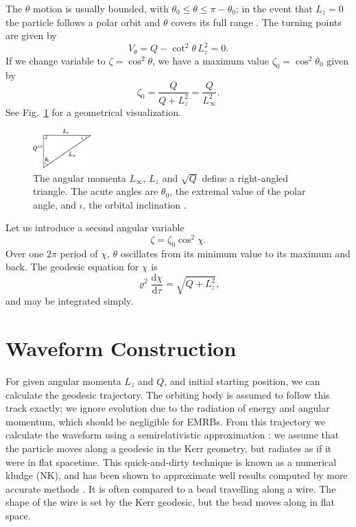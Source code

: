 \documentclass[useAMS,usedcolumn,usegraphicx,usenatbib]{mn2e}
\newcommand{\figref}[1]{Fig.~\ref{fig:#1}}
\newcommand{\dd}{\ensuremath{\mathrm{d}}}
\newcommand{\diff}[2]{\ensuremath{\frac{\dd {#1}}{\dd {#2}}}}
\begin{document}
The $\theta$ motion is usually bounded, with $\theta_0 \leq \theta \leq \pi - \theta_0$; in the event that $L_z = 0$ the particle follows a polar orbit and $\theta$ covers its full range \citep{Wilkins1972}. The turning points are given by
\begin{equation}
V_\theta = Q - \cot^2\theta\, L_z^2 = 0.
\end{equation}
If we change variable to $\zeta = \cos^2\theta$, we have a maximum value $\zeta_0 = \cos^2\theta_0$ given by
\begin{equation}
\zeta_0 = \frac{Q}{Q+L_z^2} = \frac{Q}{L_\infty^2}.
\label{eq:theta_0}
\end{equation}
See \figref{L_triangle} for a geometrical visualization.
\begin{figure}
\begin{center}
\includegraphics[width=0.2\textwidth]{Triangle.eps}
    \caption{The angular momenta $L_\infty$, $L_z$ and $\sqrt{Q}$ define a right-angled triangle. The acute angles are $\theta_0$, the extremal value of the polar angle, and $\iota$, the orbital inclination \citep*{Glampedakis2002}.}
   \label{fig:L_triangle}
\end{center}
\end{figure}
Let us introduce a second angular variable \citep{Drasco2004}
\begin{equation}
\zeta = \zeta_0\cos^2\chi.
\end{equation}
Over one $2\pi$ period of $\chi$, $\theta$ oscillates from its minimum value to its maximum and back. The geodesic equation for $\chi$ is
\begin{equation}
\varrho^2\diff{\chi}{\tau} = \sqrt{Q + L_z^2},
\end{equation}
and may be integrated simply.

\section{Waveform Construction}\label{sec:Kludge}

For given angular momenta $L_z$ and $Q$, and initial starting position, we can calculate the geodesic trajectory. The orbiting body is assumed to follow this track exactly; we ignore evolution due to the radiation of energy and angular momentum, which should be negligible for EMRBs. From this trajectory we calculate the waveform using a semirelativistic approximation \citep{Ruffini1981}: we assume that the particle moves along a geodesic in the Kerr geometry, but radiates as if it were in flat spacetime. This quick-and-dirty technique is known as a numerical kludge (NK), and has been shown to approximate well results computed by more accurate methods \citep{Babak2007}. It is often compared to a bead travelling along a wire. The shape of the wire is set by the Kerr geodesic, but the bead moves along in flat space.
\end{document}
